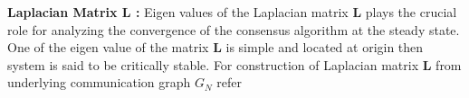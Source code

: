 \documentclass[twocolumn]{IETEJR}
\begin{document}
%

\textbf{Laplacian Matrix $\textbf{L}$ :}  Eigen values of the Laplacian matrix $\textbf{L}$ plays the crucial role for analyzing the convergence of the consensus algorithm at the steady state. One of the eigen value of the matrix $\textbf{L}$ is simple and located at origin then system is said to be critically stable. For construction of Laplacian matrix $\textbf{L}$ from underlying communication graph $G_{N}$ refer \cite{17}   
\end{document}

